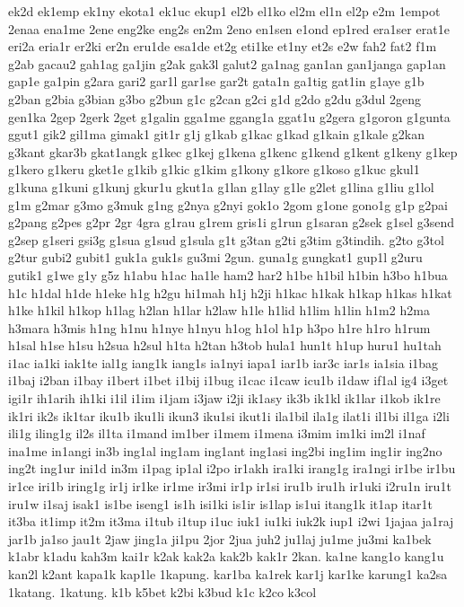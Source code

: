 ek2d
ek1emp
ek1ny
ekota1
ek1uc
ekup1
el2b
el1ko
el2m
el1n
el2p
e2m
1empot
2enaa
ena1me
2ene
eng2ke
eng2s
en2m
2eno
en1sen
e1ond
ep1red
era1ser
erat1e
eri2a
eria1r
er2ki
er2n
eru1de
esa1de
et2g
eti1ke
et1ny
et2s
e2w
fah2
fat2
f1m
g2ab
gacau2
gah1ag
ga1jin
g2ak
gak3l
galut2
ga1nag
gan1an
gan1janga
gap1an
gap1e
ga1pin
g2ara
gari2
gar1l
gar1se
gar2t
gata1n
ga1tig
gat1in
g1aye
g1b
g2ban
g2bia
g3bian
g3bo
g2bun
g1c
g2can
g2ci
g1d
g2do
g2du
g3dul
2geng
gen1ka
2gep
2gerk
2get
g1galin
gga1me
ggang1a
ggat1u
g2gera
g1goron
g1gunta
ggut1
gik2
gil1ma
gimak1
git1r
g1j
g1kab
g1kac
g1kad
g1kain
g1kale
g2kan
g3kant
gkar3b
gkat1angk
g1kec
g1kej
g1kena
g1kenc
g1kend
g1kent
g1keny
g1kep
g1kero
g1keru
gket1e
g1kib
g1kic
g1kim
g1kony
g1kore
g1koso
g1kuc
gkul1
g1kuna
g1kuni
g1kunj
gkur1u
gkut1a
g1lan
g1lay
g1le
g2let
g1lina
g1liu
g1lol
g1m
g2mar
g3mo
g3muk
g1ng
g2nya
g2nyi
gok1o
2gom
g1one
gono1g
g1p
g2pai
g2pang
g2pes
g2pr
2gr
4gra
g1rau
g1rem
gris1i
g1run
g1saran
g2sek
g1sel
g3send
g2sep
g1seri
gsi3g
g1sua
g1sud
g1sula
g1t
g3tan
g2ti
g3tim
g3tindih.
g2to
g3tol
g2tur
gubi2
gubit1
guk1a
guk1s
gu3mi
2gun.
guna1g
gungkat1
gup1l
g2uru
gutik1
g1we
g1y
g5z
h1abu
h1ac
ha1le
ham2
har2
h1be
h1bil
h1bin
h3bo
h1bua
h1c
h1dal
h1de
h1eke
h1g
h2gu
hi1mah
h1j
h2ji
h1kac
h1kak
h1kap
h1kas
h1kat
h1ke
h1kil
h1kop
h1lag
h2lan
h1lar
h2law
h1le
h1lid
h1lim
h1lin
h1m2
h2ma
h3mara
h3mis
h1ng
h1nu
h1nye
h1nyu
h1og
h1ol
h1p
h3po
h1re
h1ro
h1rum
h1sal
h1se
h1su
h2sua
h2sul
h1ta
h2tan
h3tob
hula1
hun1t
h1up
huru1
hu1tah
i1ac
ia1ki
iak1te
ial1g
iang1k
iang1s
ia1nyi
iapa1
iar1b
iar3c
iar1s
ia1sia
i1bag
i1baj
i2ban
i1bay
i1bert
i1bet
i1bij
i1bug
i1cac
i1caw
icu1b
i1daw
if1al
ig4
i3get
igi1r
ih1arih
ih1ki
i1il
i1im
i1jam
i3jaw
i2ji
ik1asy
ik3b
ik1kl
ik1lar
i1kob
ik1re
ik1ri
ik2s
ik1tar
iku1b
iku1li
ikun3
iku1si
ikut1i
ila1bil
ila1g
ilat1i
il1bi
il1ga
i2li
ili1g
iling1g
il2s
il1ta
i1mand
im1ber
i1mem
i1mena
i3mim
im1ki
im2l
i1naf
ina1me
in1angi
in3b
ing1al
ing1am
ing1ant
ing1asi
ing2bi
ing1im
ing1ir
ing2no
ing2t
ing1ur
ini1d
in3m
i1pag
ip1al
i2po
ir1akh
ira1ki
irang1g
ira1ngi
ir1be
ir1bu
ir1ce
iri1b
iring1g
ir1j
ir1ke
ir1me
ir3mi
ir1p
ir1si
iru1b
iru1h
ir1uki
i2ru1n
iru1t
iru1w
i1saj
isak1
is1be
iseng1
is1h
isi1ki
is1ir
is1lap
is1ui
itang1k
it1ap
itar1t
it3ba
it1imp
it2m
it3ma
i1tub
i1tup
i1uc
iuk1
iu1ki
iuk2k
iup1
i2wi
1jajaa
ja1raj
jar1b
ja1so
jau1t
2jaw
jing1a
ji1pu
2jor
2jua
juh2
ju1laj
ju1me
ju3mi
ka1bek
k1abr
k1adu
kah3m
kai1r
k2ak
kak2a
kak2b
kak1r
2kan.
ka1ne
kang1o
kang1u
kan2l
k2ant
kapa1k
kap1le
1kapung.
kar1ba
ka1rek
kar1j
kar1ke
karung1
ka2sa
1katang.
1katung.
k1b
k5bet
k2bi
k3bud
k1c
k2co
k3col
